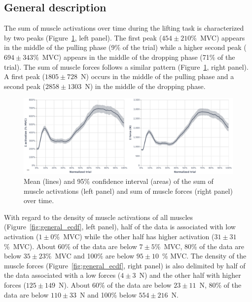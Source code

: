 \subsection{General description}\label{subsec:general-description}

The sum of muscle activations over time during the lifting task is characterized by two peaks (Figure~\ref{fig:general_sum}, left panel).
The first peak ($454 \pm 210$\%~MVC) appears in the middle of the pulling phase (9\% of the trial) while a higher second peak ($694 \pm 343$\%~MVC) appears in the middle of the dropping phase (71\% of the trial).
The sum of muscle forces follows a similar pattern (Figure~\ref{fig:general_sum}, right panel).
A first peak ($1805 \pm 728$~N) occurs in the middle of the pulling phase and a second peak ($2858 \pm 1303$~N) in the middle of the dropping phase.

\begin{figure}[H]
    \centering\includegraphics[width=1\linewidth]{fig/sum_general.pdf}
    \caption{Mean (lines) and 95\% confidence interval (areas) of the sum of muscle activations (left panel) and sum of muscle forces (right panel) over time.}
    \label{fig:general_sum}
\end{figure}

With regard to the density of muscle activations of all muscles (Figure~\ref{fig:general_ecdf}, left panel), half of the data is associated with low activation ($1 \pm 0$\%~MVC) while the other half has higher activation ($31 \pm 31$\%~MVC).
About 60\% of the data are below $7 \pm 5$\%~MVC, 80\% of the data are below $35 \pm 23$\%~MVC and 100\% are below $95 \pm 10$~\% MVC\@.
The density of the muscle forces (Figure~\ref{fig:general_ecdf}, right panel) is also delimited by half of the data associated with a low forces ($4 \pm 3$~N) and the other half with higher forces ($125 \pm 149$~N).
About 60\% of the data are below $23 \pm 11$~N, 80\% of the data are below $110 \pm 33$~N and 100\% below $554 \pm 216$~N\@.

